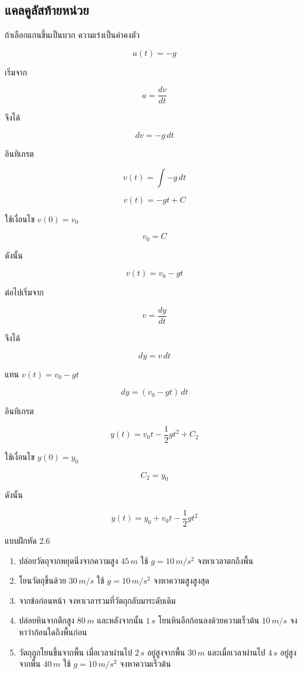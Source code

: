 \documentclass[12pt,a4paper]{report}
\begin{document}
\subsection{แคลคูลัสท้ายหน่วย}

ถ้าเลือกแกนขึ้นเป็นบวก ความเร่งเป็นค่าคงตัว

\[
a(t)=-g
\]

เริ่มจาก

\[
a=\frac{dv}{dt}
\]

จึงได้

\[
dv=-g\,dt
\]

อินทิเกรต

\[
v(t)=\int -g\,dt
\]

\[
v(t)=-gt+C
\]

ใช้เงื่อนไข $v(0)=v_0$

\[
v_0=C
\]

ดังนั้น

\[
v(t)=v_0-gt
\]

ต่อไปเริ่มจาก

\[
v=\frac{dy}{dt}
\]

จึงได้

\[
dy=v\,dt
\]

แทน $v(t)=v_0-gt$

\[
dy=(v_0-gt)\,dt
\]

อินทิเกรต

\[
y(t)=v_0t-\frac{1}{2}gt^2+C_2
\]

ใช้เงื่อนไข $y(0)=y_0$

\[
C_2=y_0
\]

ดังนั้น

\[
y(t)=y_0+v_0t-\frac{1}{2}gt^2
\]

\begin{exercisebox}{แบบฝึกหัด 2.6}
\begin{enumerate}
    \item ปล่อยวัตถุจากหยุดนิ่งจากความสูง $45\,\si{m}$ ใช้ $g=10\,\si{m/s^2}$ จงหาเวลาตกถึงพื้น
    \item โยนวัตถุขึ้นด้วย $30\,\si{m/s}$ ใช้ $g=10\,\si{m/s^2}$ จงหาความสูงสูงสุด
    \item จากข้อก่อนหน้า จงหาเวลารวมที่วัตถุกลับมาระดับเดิม
    \item ปล่อยหินจากตึกสูง $80\,\si{m}$ และหลังจากนั้น $1\,\si{s}$ โยนหินอีกก้อนลงด้วยความเร็วต้น $10\,\si{m/s}$ จงหาว่าก้อนใดถึงพื้นก่อน
    \item วัตถุถูกโยนขึ้นจากพื้น เมื่อเวลาผ่านไป $2\,\si{s}$ อยู่สูงจากพื้น $30\,\si{m}$ และเมื่อเวลาผ่านไป $4\,\si{s}$ อยู่สูงจากพื้น $40\,\si{m}$ ใช้ $g=10\,\si{m/s^2}$ จงหาความเร็วต้น
\end{enumerate}
\end{exercisebox}
\end{document}
